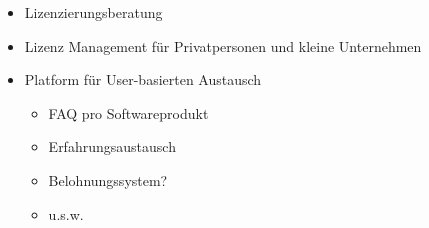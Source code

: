 	\begin{itemize}
	  \item Lizenzierungsberatung
		\item Lizenz Management f\"ur Privatpersonen und kleine Unternehmen
		\item Platform f\"ur User-basierten Austausch
		\begin{itemize}
			\item FAQ pro Softwareprodukt
			\item Erfahrungsaustausch
			\item Belohnungssystem?
			\item u.s.w.
		\end{itemize}
	\end{itemize}
